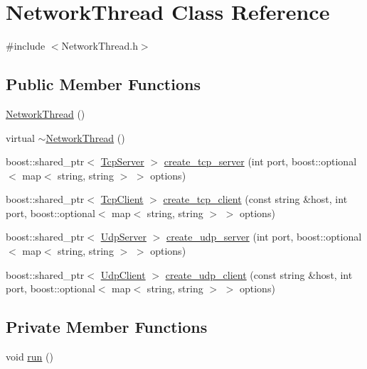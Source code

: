 \hypertarget{classNetworkThread}{
\section{NetworkThread Class Reference}
\label{classNetworkThread}
}


{\ttfamily \#include $<$NetworkThread.h$>$}

\subsection*{Public Member Functions}
\begin{DoxyCompactItemize}
\item 
\hyperlink{classNetworkThread_a19bdf760c822f879a1f8a6700ee19e52}{NetworkThread} ()
\item 
virtual \hyperlink{classNetworkThread_adaed788a9be6fbb4ed1aef9905e3e18f}{$\sim$NetworkThread} ()
\item 
boost::shared\_\-ptr$<$ \hyperlink{classTcpServer}{TcpServer} $>$ \hyperlink{classNetworkThread_a84196d67235b83ba74d62e292f0a989c}{create\_\-tcp\_\-server} (int port, boost::optional$<$ map$<$ string, string $>$ $>$ options)
\item 
boost::shared\_\-ptr$<$ \hyperlink{classTcpClient}{TcpClient} $>$ \hyperlink{classNetworkThread_a7ad75918bab6747ea97ed3f0f4a9a560}{create\_\-tcp\_\-client} (const string \&host, int port, boost::optional$<$ map$<$ string, string $>$ $>$ options)
\item 
boost::shared\_\-ptr$<$ \hyperlink{classUdpServer}{UdpServer} $>$ \hyperlink{classNetworkThread_ab54b7e487112e608a23627ae04c70096}{create\_\-udp\_\-server} (int port, boost::optional$<$ map$<$ string, string $>$ $>$ options)
\item 
boost::shared\_\-ptr$<$ \hyperlink{classUdpClient}{UdpClient} $>$ \hyperlink{classNetworkThread_a4198f121c3884eb0f6857a35c8b66af7}{create\_\-udp\_\-client} (const string \&host, int port, boost::optional$<$ map$<$ string, string $>$ $>$ options)
\end{DoxyCompactItemize}
\subsection*{Private Member Functions}
\begin{DoxyCompactItemize}
\item 
void \hyperlink{classNetworkThread_a8659a516d3561c486844bf7bc9aff8b0}{run} ()
\end{DoxyCompactItemize}
